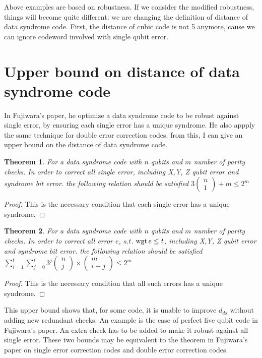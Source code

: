 \documentclass[aps,prb,12pt,tightenlines,%
notitlepage,longbibliography]{revtex4-1}
\newtheorem{theorem}{Theorem}
\begin{document}
Above examples are based on robustness. If we consider the modified robustness, things will become quite different: we are changing the definition of distance of data syndrome code. First, the distance of cubic code is not 5 anymore, cause we can ignore codeword involved with single qubit error.

\section{Upper bound on distance of data syndrome code}
In Fujiwara's paper, he optimize a data syndrome code to be robust against single error, by ensuring each single error has a unique syndrome. He also appply the same technique for double error correction codes. from this, I can give an upper bound on the distance of data syndrome code.
\begin{theorem}
For a data syndrome code with $n$ qubits and $m$ number of parity checks. In order to correct all single error, including X,Y, Z qubit error and syndrome bit error. the following relation should be satisfied
$3\left( \begin{array}{c} n\\1 \end{array} \right)+m \le 2^m$
\end{theorem}
\begin{proof}
This is the necessary condition that each single error has a unique syndrome.
\end{proof}
\begin{theorem}
For a data syndrome code with $n$ qubits and $m$ number of parity checks. In order to correct all error $e$, $s.t.$ $\mathop{\rm wgt}{e}\le t$, including X,Y, Z qubit error and syndrome bit error. the following relation should be satisfied
$\displaystyle \sum_{i=1}^t  \sum_{j=0}^i 3^j\left( \begin{array}{c} n\\j \end{array} \right) \times \left( \begin{array}{c} m\\i-j \end{array} \right)  \le 2^m$
\end{theorem}
\begin{proof}
This is the necessary condition that all such errors has a unique syndrome.
\end{proof}
This upper bound shows that, for some code, it is unable to improve $d_{ds}$ without adding new redundant checks. An example is the case of perfect five qubit code in Fujiwara's paper. An extra check has to be added to make it robust against all single error.
These two bounds may be equivalent to the theorem in Fujiwara's paper on single error correction codes and double error correction codes.
\end{document}

